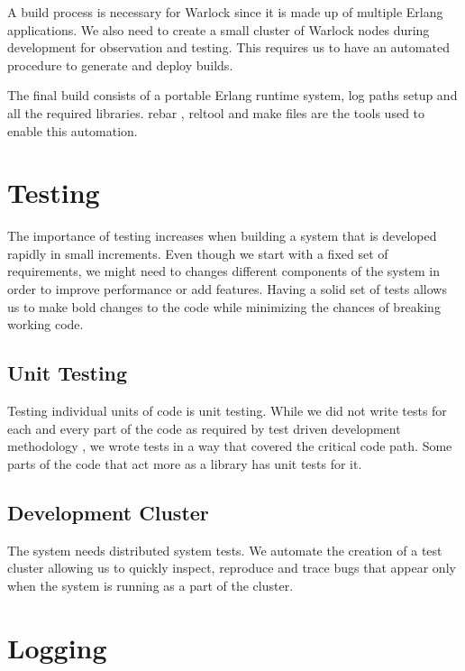A build%
process is necessary for Warlock since it is made up of multiple Erlang
applications. We also need to create a small cluster of Warlock nodes during
development for observation and testing. This requires us to have an automated
procedure to generate and deploy builds.

The final build consists of a portable Erlang runtime system, log
paths setup and all the required libraries. rebar \citep{rebar}, reltool
\citep{reltool} and make files \citep{makefiles} are the tools used to enable
this automation.

\section{Testing}
\label{section:impl.testing}

The importance of testing increases when building a system that is developed
rapidly in small increments. Even though we start with a fixed set of
requirements, we might
need to changes different components of the system in order to improve
performance or add features. Having a solid set of tests allows
us to make bold changes to the code while minimizing the chances of breaking
working code.

\subsection{Unit Testing}

Testing individual units of code is unit
testing. While we did not write tests for each and every part of the code as
required by test driven development methodology \citep{Beck:2002:TDD:579193},
we wrote tests in a way that covered the critical code path.
Some parts of the code that act more as a library has unit tests for it.

\subsection{Development Cluster}

The system needs distributed system tests. We automate the creation of a test
cluster allowing us to quickly inspect, reproduce and trace bugs that appear
only when the system is running as a part of the cluster.

\section{Logging}

